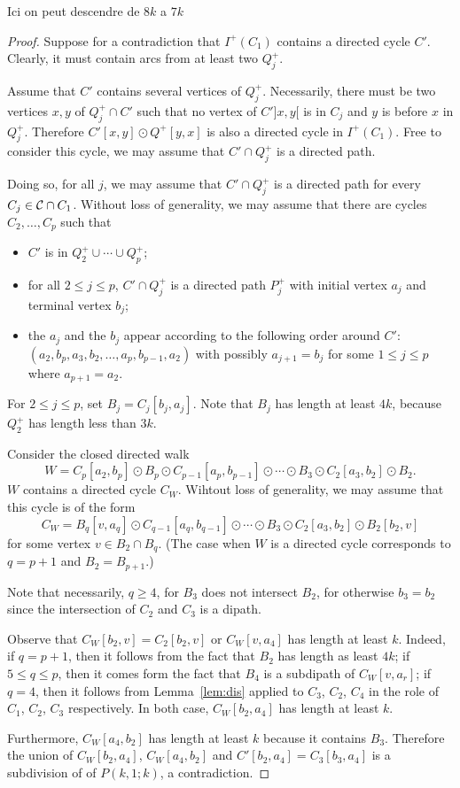 \documentclass[utf8,10pt]{article}
\theoremstyle{plain}
\theoremstyle{definition}
\theoremstyle{remark}
\newcommand{\FH}[1]{{\color{red}{\bf Fred:} #1}}
\begin{document}
\FH{Ici on peut descendre de $8k$ a $7k$}
\begin{proof}

Suppose for a contradiction that $I^+(C_1)$  contains a directed cycle $C'$.
Clearly, it must contain arcs from at least two $Q^+_j$.



Assume that $C'$ contains several vertices of $Q^+_j$.
Necessarily, there must be two vertices $x,y$ of $Q^+_j\cap C'$ such that no vertex of $C']x,y[$ is in $C_j$ and  $y$ is before $x$ in $Q^+_j$.
Therefore $C'[x,y]\odot Q^+[y,x]$ is also a directed cycle in $I^+(C_1)$. Free to consider this cycle,
we may assume that $C'\cap Q^+_j$ is a directed path.

Doing so, for all $j$, we may assume that $C'\cap Q^+_j$ is a directed path  for every $C_j\in {\cal C}\cap C_1$.
Without loss of generality, we may assume that there are cycles $C_2, \dots , C_p$ such that
\begin{itemize}
\item $C'$ is in $Q^+_2\cup \cdots  \cup Q^+_p$;
\item for all $2\leq j\leq p$, $C'\cap Q^+_j$ is a directed path $P^+_j$ with initial vertex $a_j$ and terminal vertex $b_j$;
\item the $a_j$ and the $b_j$ appear according to the following order around $C'$: $(a_2, b_p, a_3, b_2, \dots ,   a_p, b_{p-1}, a_2)$ with possibly $a_{j+1}=b_j$ for some $1\leq j \leq p$ where $a_{p+1}=a_2$.
\end{itemize}
For $2\leq j\leq p$, set $B_j=C_j[b_j, a_j]$. Note that $B_j$ has length at least $4k$, because $Q^+_2$ has length less than $3k$.


Consider the closed directed walk $$W=C_p[a_2,b_p]\odot B_p \odot C_{p-1}[a_p, b_{p-1}] \odot  \cdots  \odot  B_3\odot C_2[a_3, b_2]\odot B_2.$$
$W$ contains a directed cycle $C_W$. Wihtout loss of generality, we may assume that this cycle is of the form
$$C_W=B_q[v, a_q] \odot C_{q-1}[a_q, b_{q-1}] \odot  \cdots  \odot  B_3\odot C_2[a_3, b_2]\odot B_2[b_2, v]$$
for some vertex $v\in B_2\cap B_q$. (The case when $W$ is a directed cycle corresponds to $q=p+1$ and $B_2=B_{p+1}$.)

Note that necessarily, $q\geq 4$, for $B_3$ does not intersect $B_2$, for otherwise $b_3=b_2$ since the intersection of $C_2$ and $C_3$ is a dipath.

Observe that $C_W[b_2,v]=C_2[b_2,v]$ or $C_W[v, a_4]$ has length at least $k$.
Indeed, if $q=p+1$, then it follows from the fact that $B_2$ has length as least $4k$; if
$5\leq q\leq p$, then it comes form the fact that $B_4$ is a subdipath of $C_W[v, a_r]$; if $q=4$, then it follows from Lemma~\ref{lem:dis}  applied to $C_3$, $C_2$, $C_4$ in the role of $C_1$, $C_2$, $C_3$ respectively.
In both case, $C_W[b_2, a_4]$ has length at least $k$. 

Furthermore, $C_W[a_4,b_2]$ has length at least $k$ because it contains $B_3$. Therefore the union of
$C_W[b_2, a_4]$, $C_W[a_4,b_2]$ and $C'[b_2,a_4]=C_3[b_3,a_4]$ is a subdivision of of $P(k,1;k)$, a contradiction.
\end{proof}
\end{document}
